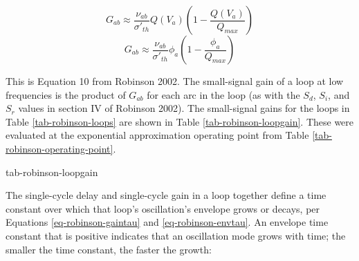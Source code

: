 \begin{equation}
G_{ab} \approx \frac{\nu_{ab}}{\sigma'_{th}}
Q(V_a) \left ( 1 - \frac{Q(V_a)}{Q_{max}} \right )
\end{equation}
%
\begin{equation}
G_{ab} \approx \frac{\nu_{ab}}{\sigma'_{th}}
\phi_a \left ( 1 - \frac{\phi_a}{Q_{max}} \right )
\label{eq-robinson-gain}
\end{equation}

This is Equation 10 from Robinson 2002. The small-signal gain of a loop at
low frequencies is the product of $G_{ab}$ for each arc in the loop
(as with the $S_d$, $S_i$, and $S_r$ values in section IV of Robinson 2002).
The small-signal gains for the loops in Table \ref{tab-robinson-loops} are
shown in Table \ref{tab-robinson-loopgain}. These were evaluated at the
exponential approximation operating point from
Table \ref{tab-robinson-operating-point}.

{tab-robinson-loopgain}

The single-cycle delay and single-cycle gain in a loop together define a time
constant over which that loop's oscillation's envelope grows or decays,
per Equations \ref{eq-robinson-gaintau} and \ref{eq-robinson-envtau}.
An envelope time constant that is positive indicates that an oscillation
mode grows with time; the smaller the time constant, the faster the growth:

